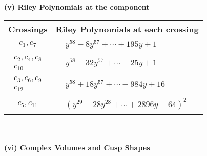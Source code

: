 \documentclass[1p]{elsarticle_modified}
\theoremstyle{definition}
\begin{document}
\newpage\renewcommand{\arraystretch}{1}
\flushleft \textbf{(v) Riley Polynomials at the component}\newline \\
\begin{tabular}{m{50pt}|m{274pt}}
Crossings & \hspace{64pt}Riley Polynomials at each crossing \\
\hline $$\begin{aligned}c_{1},c_{7}\end{aligned}$$&$\begin{aligned}
&y^{58}-8 y^{57}+\cdots+195 y+1
\end{aligned}$\\
\hline $$\begin{aligned}c_{2},c_{4},c_{8}\\c_{10}\end{aligned}$$&$\begin{aligned}
&y^{58}-32 y^{57}+\cdots-25 y+1
\end{aligned}$\\
\hline $$\begin{aligned}c_{3},c_{6},c_{9}\\c_{12}\end{aligned}$$&$\begin{aligned}
&y^{58}+18 y^{57}+\cdots-984 y+16
\end{aligned}$\\
\hline $$\begin{aligned}c_{5},c_{11}\end{aligned}$$&$\begin{aligned}
&(y^{29}-28 y^{28}+\cdots+2896 y-64)^{2}
\end{aligned}$\\
\hline
\end{tabular}\\~\\
\newpage\flushleft \textbf{(vi) Complex Volumes and Cusp Shapes}
\end{document}
